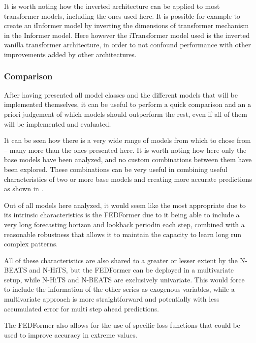 \begin{itemize}
    It is worth noting how the inverted architecture can be applied to most transformer models, including the ones used here. It is possible for example to create an iInformer model by inverting the dimensions of transformer mechanism in the Informer model. Here however the iTransformer model used is the inverted vanilla transformer architecture, in order to not confound performance with other improvements added by other architectures. 
\end{itemize}
\subsubsection{Comparison}
After having presented all model classes and the different models that will be implemented themselves, it can be useful to perform a quick comparison and an a priori judgement of which models should outperform the rest, even if all of them will be implemented and evaluated. 

It can be seen how there is a very wide range of models from which to chose from -- many more than the ones presented here. It is worth noting how here only the base models have been analyzed, and no custom combinations between them have been explored. These combinations can be very useful in combining useful characteristics of two or more base models and creating more accurate predictions as shown in \cite{zou_yang_2004}.

Out of all models here analyzed, it would seem like the most appropriate due to its intrinsic characteristics is the FEDFormer due to it being able to include a very long forecasting horizon and lookback periodin each step, combined with a reasonable robustness that allows it to maintain the capacity to learn long run complex patterns.

All of these characteristics are also shared to a greater or lesser extent by the N-BEATS and N-HiTS, but the FEDFormer can be deployed in a multivariate setup, while N-HiTS and N-BEATS are exclusively univariate. This would force to include the information of the other series as exogenous variables, while a multivariate approach is more straightforward and potentially with less accumulated error for multi step ahead predictions.  

The FEDFormer also allows for the use of specific loss functions that could be used to improve accuracy in extreme values. 

